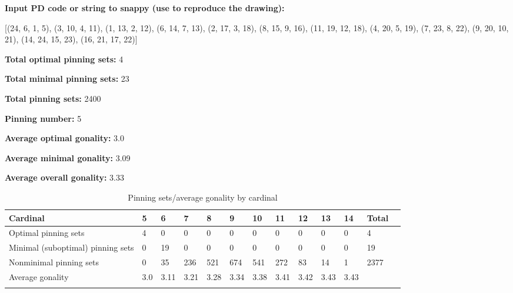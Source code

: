 \documentclass{article}%
\begin{document}
%
\small

\begin{multicols}{2}
\noindent\textbf{Input PD code or string to snappy (use to reproduce the drawing):}

	[(24, 6, 1, 5), (3, 10, 4, 11), (1, 13, 2, 12), (6, 14, 7, 13), (2, 17, 3, 18), (8, 15, 9, 16), (11, 19, 12, 18), (4, 20, 5, 19), (7, 23, 8, 22), (9, 20, 10, 21), (14, 24, 15, 23), (16, 21, 17, 22)]


\columnbreak

\noindent\textbf{Total optimal pinning sets:} 4

\noindent\textbf{Total minimal pinning sets:} 23

\noindent\textbf{Total pinning sets:} 2400

\noindent\textbf{Pinning number:} 5

\noindent\textbf{Average optimal gonality:} 3.0

\noindent\textbf{Average minimal gonality:} 3.09

\noindent\textbf{Average overall gonality:} 3.33


\end{multicols}

\begin{table}[ht]
	\caption{Pinning sets/average gonality by cardinal}
	\centering
	\renewcommand{\arraystretch}{1.5}
	\begin{tabularx}{\textwidth}{lXXXXXXXXXXXX}
		\toprule
			Cardinal & 5 & 6 & 7 & 8 & 9 & 10 & 11 & 12 & 13 & 14 & Total\\
			\hline
			Optimal pinning sets & 4 & 0 & 0 & 0 & 0 & 0 & 0 & 0 & 0 & 0 & 4 \\
			Minimal (suboptimal) pinning sets & 0 & 19 & 0 & 0 & 0 & 0 & 0 & 0 & 0 & 0 & 19 \\
			Nonminimal pinning sets & 0 & 35 & 236 & 521 & 674 & 541 & 272 & 83 & 14 & 1 & 2377 \\
			Average gonality & 3.0 & 3.11 & 3.21 & 3.28 & 3.34 & 3.38 & 3.41 & 3.42 & 3.43 & 3.43 &  \\
		\bottomrule \\ 
	\end{tabularx}
\end{table}
\end{document}
